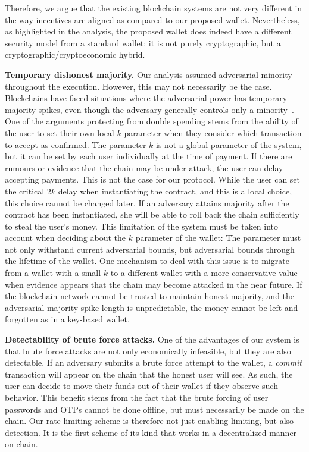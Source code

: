 Therefore, we argue that the existing blockchain systems are not very
different in the way incentives are aligned as compared to our proposed
wallet. Nevertheless, as highlighted in the analysis, the proposed wallet
does indeed have a different security model from a standard wallet: it
is not purely cryptographic, but a cryptographic/cryptoeconomic hybrid.

\noindent
\textbf{Temporary dishonest majority.}
Our analysis assumed adversarial minority
throughout the execution. However, this may not necessarily be the case.
Blockchains have faced situations where
the adversarial power has temporary majority spikes,
even though the adversary generally controls only a
minority~\cite{temporary-dishonest,supremacy}.
One of the arguments protecting from double spending stems from
the ability of the user to set their own local $k$ parameter when they
consider which transaction to accept as confirmed. The parameter $k$ is
not a global parameter of the system, but it can be set by each user
individually at the time of payment. If there are rumours or evidence
that the chain may be under attack, the user can delay accepting payments.
This is not the case for our protocol. While the user can set the critical
$2k$ delay when instantiating the contract, and this is a local choice,
this choice cannot be changed later. If an adversary attains majority
after the contract has been instantiated, she will be able to roll
back the chain sufficiently to steal the user's money. This limitation
of the system must be taken into account when deciding about the $k$
parameter of the wallet: The parameter must not only withstand current
adversarial bounds, but adversarial bounds through the lifetime of the
wallet. One mechanism to deal with this issue is to migrate from a
wallet with a small $k$ to a different wallet with a more
conservative value when evidence appears that the chain may become
attacked in the near future. If the blockchain network cannot be
trusted to maintain honest majority, and the adversarial majority spike
length is unpredictable, the money cannot be left and forgotten
as in a key-based wallet.

\noindent
\textbf{Detectability of brute force attacks.}
One of the advantages of our system is that brute force attacks are
not only economically infeasible, but they are also detectable. If an
adversary submits a brute force attempt to the wallet, a \emph{commit}
transaction will appear on the chain that the honest user will see.
As such, the user can decide to move their funds out of their wallet
if they observe such behavior. This benefit stems from the fact that
the brute forcing of user passwords and OTPs cannot be done offline,
but must necessarily be made on the chain. Our rate limiting scheme
is therefore not just enabling limiting, but also detection. It is
the first scheme of its kind that works in a decentralized manner
on-chain.
